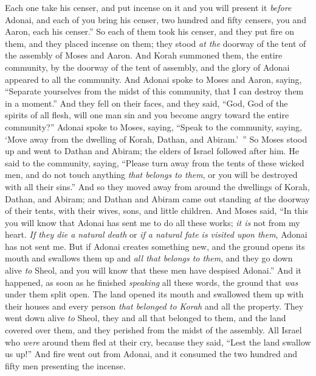 \begin{biblechapter}
\verse Each one take his censer, and put incense on it and you will present it \textit{before} Adonai, and each of you bring his censer, two hundred and fifty censers, you and Aaron, each his censer.”
\verse So each of them took his censer, and they put fire on them, and they placed incense on them; they stood \textit{at the} doorway of the tent of the assembly of Moses and Aaron.
\verse And Korah summoned them, the entire community, by the doorway of the tent of assembly, and the glory of Adonai appeared to all the community.
\verse And Adonai spoke to Moses and Aaron, saying,
\verse “Separate yourselves from the midst of this community, that I can destroy them in a moment.”
\verse And they fell on their faces, and they said, “God, God of the spirits of all flesh, will one man sin and you become angry toward the entire community?”
\verse Adonai spoke to Moses, saying,
\verse “Speak to the community, saying, ‘Move away from the dwelling of Korah, Dathan, and Abiram.’ ”
\verse So Moses stood up and went to Dathan and Abiram; the elders of Israel followed after him.
\verse He said to the community, saying, “Please turn away from the tents of these wicked men, and do not touch anything \textit{that belongs to them}, or you will be destroyed with all their sins.”
\verse And so they moved away from around the dwellings of Korah, Dathan, and Abiram; and Dathan and Abiram came out standing \textit{at} the doorway of their tents, with their wives, sons, and little children.
\verse And Moses said, “In this you will know that Adonai has sent me to do all these works; \textit{it is} not from my heart.
\verse \textit{If they die a natural death} or \textit{if a natural fate is visited upon them}, Adonai has not sent me.
\verse But if Adonai creates something new, and the ground opens its mouth and swallows them up and \textit{all that belongs to them}, and they go down alive \textit{to} Sheol, and you will know that these men have despised Adonai.”
\verse And it happened, as soon as he finished \textit{speaking} all these words, the ground that \textit{was} under them split open.
\verse The land opened its mouth and swallowed them up with their houses and every person \textit{that belonged to Korah} and all the property.
\verse They went down alive \textit{to} Sheol, they and all that belonged to them, and the land covered over them, and they perished from the midst of the assembly.
\verse All Israel who \textit{were} around them fled at their cry, because they said, “Lest the land swallow us up!”
\verse And fire went out from Adonai, and it consumed the two hundred and fifty men presenting the incense.

\end{biblechapter}
